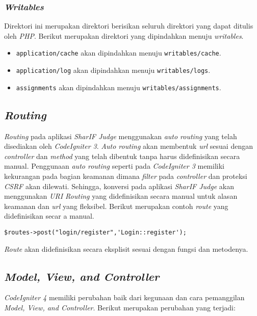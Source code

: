 \subsubsection{\textit{Writables}}
Direktori ini merupakan direktori berisikan seluruh direktori yang dapat ditulis oleh \textit{PHP}. Berikut merupakan direktori yang dipindahkan menuju \textit{writables}.
\begin{itemize}
\item \verb|application/cache| akan dipindahkan menuju \texttt{writables/cache}.
\item \verb|application/log| akan dipindahkan menuju \texttt{writables/logs}.
\item \verb|assignments| akan dipindahkan menuju \texttt{writables/assignments}.
\end{itemize}

\subsection{\textit{Routing}}
\textit{Routing} pada aplikasi \textit{SharIF Judge} menggunakan \textit{auto routing} yang telah disediakan oleh \textit{CodeIgniter 3}. \textit{Auto routing} akan membentuk \textit{url} sesuai dengan \textit{controller} dan \textit{method} yang telah dibentuk tanpa harus didefinisikan secara manual. Penggunaan \textit{auto routing} seperti pada \textit{CodeIgniter 3} memiliki kekurangan pada bagian keamanan dimana \textit{filter} pada \textit{controller} dan proteksi \textit{CSRF} akan dilewati. Sehingga, konversi pada aplikasi \textit{SharIF Judge} akan menggunakan \textit{URI Routing} yang didefinisikan secara manual untuk alasan keamanan dan \textit{url} yang fleksibel. Berikut merupakan contoh \textit{route} yang didefinisikan secar a manual.
\begin{center}
\verb|$routes->post("login/register",'Login::register');|
\end{center}
\textit{Route} akan didefinisikan secara eksplisit sesuai dengan fungsi dan metodenya.

\subsection{\textit{Model, View, and Controller}}
\textit{CodeIgniter 4} memiliki perubahan baik dari kegunaan dan cara pemanggilan \textit{Model, View, and Controller}. Berikut merupakan perubahan yang terjadi:
